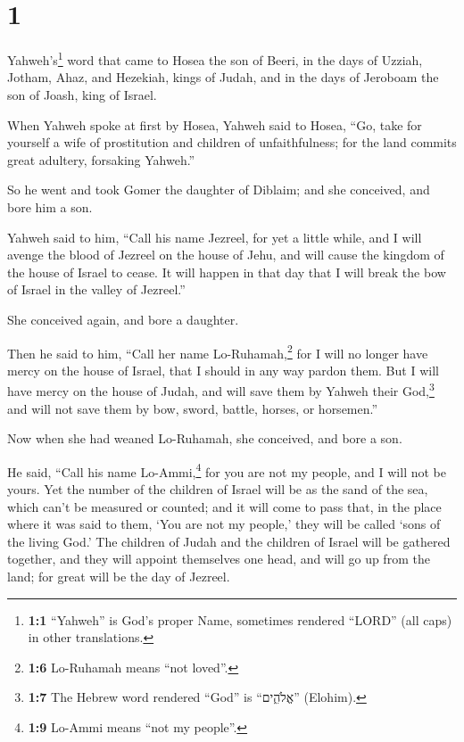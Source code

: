 \hypertarget{section}{%
\section{1}\label{section}}

 Yahweh's\footnote{\textbf{1:1} ``Yahweh'' is God's proper
  Name, sometimes rendered ``LORD'' (all caps) in other translations.}
word that came to Hosea the son of Beeri, in the days of Uzziah, Jotham,
Ahaz, and Hezekiah, kings of Judah, and in the days of Jeroboam the son
of Joash, king of Israel.

 When Yahweh spoke at first by Hosea, Yahweh said to
Hosea, ``Go, take for yourself a wife of prostitution and children of
unfaithfulness; for the land commits great adultery, forsaking Yahweh.''

 So he went and took Gomer the daughter of Diblaim; and
she conceived, and bore him a son.

 Yahweh said to him, ``Call his name Jezreel, for yet a
little while, and I will avenge the blood of Jezreel on the house of
Jehu, and will cause the kingdom of the house of Israel to cease.
 It will happen in that day that I will break the bow of
Israel in the valley of Jezreel.''

 She conceived again, and bore a daughter.

Then he said to him, ``Call her name Lo-Ruhamah,\footnote{\textbf{1:6}
  Lo-Ruhamah means ``not loved''.} for I will no longer have mercy on
the house of Israel, that I should in any way pardon them.
 But I will have mercy on the house of Judah, and will
save them by Yahweh their God,\footnote{\textbf{1:7} The Hebrew word
  rendered ``God'' is ``אֱלֹהִ֑ים'' (Elohim).} and will not save them by
bow, sword, battle, horses, or horsemen.''

 Now when she had weaned Lo-Ruhamah, she conceived, and
bore a son.

 He said, ``Call his name Lo-Ammi,\footnote{\textbf{1:9}
  Lo-Ammi means ``not my people''.} for you are not my people, and I
will not be yours.  Yet the number of the children of
Israel will be as the sand of the sea, which can't be measured or
counted; and it will come to pass that, in the place where it was said
to them, `You are not my people,' they will be called `sons of the
living God.'  The children of Judah and the children of
Israel will be gathered together, and they will appoint themselves one
head, and will go up from the land; for great will be the day of
Jezreel.

